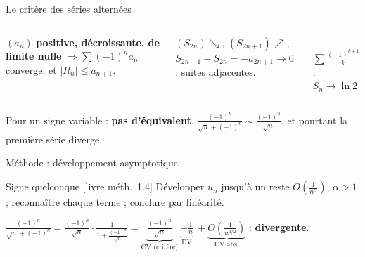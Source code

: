 \documentclass[aspectratio=169,10pt]{beamer}
\DeclareRobustCommand{\livre}[1]{{\sffamily\scriptsize\color{Gris}[livre #1]}}
\begin{document}
\begin{frame}{Le critère des séries alternées}
\begin{columns}[T]
\begin{PROP}[\livre{th.~1.32}]
$(a_n)$ \textbf{positive, décroissante, de limite nulle} $\Rightarrow\sum(-1)^na_n$ converge, et $|R_n|\leq a_{n+1}$.
\end{PROP}
\pause
\begin{RAIS}[La preuve]
$(S_{2n})\searrow$, $(S_{2n+1})\nearrow$, $S_{2n+1}-S_{2n}=-a_{2n+1}\to0$ : suites adjacentes.
\end{RAIS}
\centering
{}\\
{\scriptsize\color{Gris}$\sum\frac{(-1)^{k+1}}k$ : $S_n\to\ln2$}
\end{columns}
\pause
\begin{PIEGE}
Pour un signe variable : \textbf{pas d'équivalent}. $\frac{(-1)^n}{\sqrt n+(-1)^n}\sim\frac{(-1)^n}{\sqrt n}$, et pourtant la première série diverge.
\end{PIEGE}
\end{frame}

\begin{frame}{Méthode : développement asymptotique}
\begin{METH}{Signe quelconque \livre{méth.~1.4}}
Développer $u_n$ jusqu'à un reste $O\left(\frac1{n^\alpha}\right)$, $\alpha>1$ ; reconnaître chaque terme ; conclure par linéarité.
\end{METH}
\pause
\begin{EX}
$\frac{(-1)^n}{\sqrt n+(-1)^n}=\frac{(-1)^n}{\sqrt n}\cdot\frac1{1+\frac{(-1)^n}{\sqrt n}}
=\underbrace{\frac{(-1)^n}{\sqrt n}}_{\text{CV (critère)}}\ \underbrace{-\frac1n}_{\text{DV}}\ +\underbrace{O\left(\frac1{n^{3/2}}\right)}_{\text{CV abs.}}$
\quad : \textbf{divergente}.
\end{EX}
\end{frame}
\end{document}
